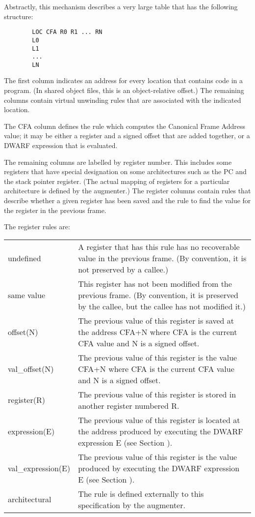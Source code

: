 Abstractly, this mechanism describes a very large table that
has the following structure:

\begin{verbatim}
        LOC CFA R0 R1 ... RN
        L0
        L1
        ...
        LN
\end{verbatim}


The first column indicates an address for every location
that contains code in a program. (In shared object files, this
is an object-relative offset.) The remaining columns contain
virtual unwinding rules that are associated with the indicated
location.

The CFA column defines the rule which computes the Canonical
Frame Address value; it may be either a register and a signed
offset that are added together, or a DWARF expression that
is evaluated.

The remaining columns are labelled by register number. This
includes some registers that have special designation on
some architectures such as the PC and the stack pointer
register. (The actual mapping of registers for a particular
architecture is defined by the augmenter.) The register columns
contain rules that describe whether a given register has been
saved and the rule to find the value for the register in the
previous frame.

The register rules are:

\begin{longtable}{lP{9cm}}
undefined 
&A register that has this rule has no recoverable value in the previous frame.
(By convention, it is not preserved by a callee.) \\

same value
&This register has not been modified from the previous frame. (By convention,
it is preserved by the callee, but the callee has not modified it.) \\

offset(N)
&The previous value of this register is saved at the address CFA+N where CFA
is the current CFA value and N is a signed offset.\\

val\_offset(N)
&The previous value of this register is the value CFA+N where CFA is the
current CFA value and N is a signed offset.\\

register(R)
&The previous value of this register is stored 
in another register numbered R.\\

expression(E)
&The previous value of this register is located at the address produced by
executing the DWARF expression E (see Section ).\\

val\_expression(E) 
&The previous value of this register is the value produced by executing the
DWARF expression E (see Section ).\\

architectural
&The rule is defined externally to this specification by the augmenter.\\

\end{longtable}

